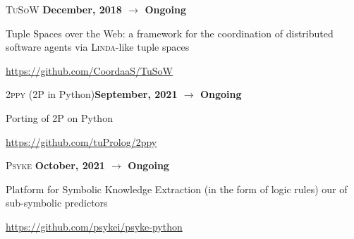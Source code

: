 \begin{activity}{\textsc{TuSoW} \cite{tusow-icccn2019}}{\textbf{December, 2018 $\rightarrow$ Ongoing}}{}{}
    \item Tuple Spaces over the Web: a framework for the coordination of distributed software agents via \textsc{Linda}-like tuple spaces
    \item \url{https://github.com/CoordaaS/TuSoW}
\end{activity}

\begin{activity}{\textsc{2ppy} (2P in Python)}{\textbf{September, 2021 $\rightarrow$ Ongoing}}{}{}
    \item Porting of 2P on Python
    \item \url{https://github.com/tuProlog/2ppy}
\end{activity}

\begin{activity}{\textsc{Psyke} \cite{psyke-woa2021}}{\textbf{October, 2021 $\rightarrow$ Ongoing}}{}{}
    \item Platform for Symbolic Knowledge Extraction (in the form of logic rules) our of sub-symbolic predictors
    \item \url{https://github.com/psykei/psyke-python}
\end{activity}
